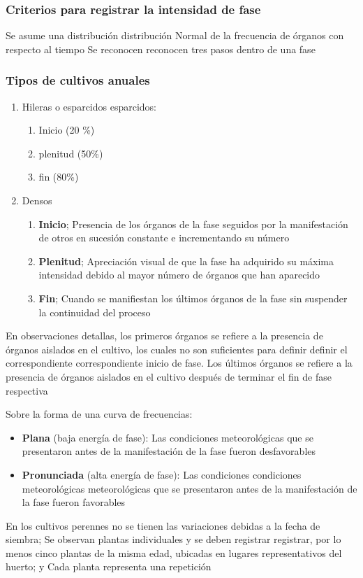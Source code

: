 \subsubsection{Criterios para registrar la intensidad de fase}

Se asume una distribución distribución Normal de la frecuencia de órganos con respecto al tiempo
Se reconocen reconocen tres pasos dentro de una fase

\subsubsection{Tipos de cultivos anuales}

\begin{enumerate}
    \item Hileras o esparcidos esparcidos: \begin{enumerate}
        \item Inicio (20 \%)
        \item plenitud (50\%)
        \item fin (80\%)
    \end{enumerate}
    \item Densos \begin{enumerate}
        \item \textbf{Inicio}; Presencia de los órganos de la fase seguidos por la manifestación de otros en sucesión constante e incrementando su número
        \item \textbf{Plenitud}; Apreciación visual de que la fase ha adquirido su máxima intensidad debido al mayor número de órganos que han aparecido
        \item \textbf{Fin}; Cuando se manifiestan los últimos órganos de la fase sin suspender la continuidad del proceso
    \end{enumerate}
\end{enumerate}

En observaciones detallas, los primeros órganos se refiere a la presencia de órganos aislados en el cultivo, los cuales no son suficientes para definir definir el correspondiente correspondiente inicio de fase. Los últimos órganos se refiere a la presencia de órganos aislados en el cultivo después de terminar el fin de fase respectiva

Sobre la forma de una curva de frecuencias:
\begin{itemize}
    \item \textbf{Plana} (baja energía de fase): Las condiciones meteorológicas que se presentaron antes de la manifestación de la fase fueron desfavorables
    \item \textbf{Pronunciada} (alta energía de fase): Las condiciones condiciones meteorológicas meteorológicas que se presentaron antes de la manifestación de la fase fueron favorables    
\end{itemize}
En los cultivos perennes no se tienen las variaciones debidas a la fecha de siembra; Se observan plantas individuales y se deben registrar registrar, por lo menos cinco plantas de la misma edad, ubicadas en lugares representativos del huerto; y Cada planta representa una repetición

